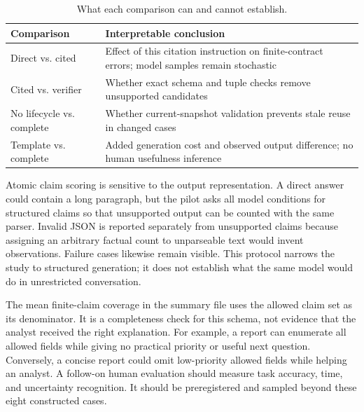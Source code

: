 \begin{table}[t]
\centering\caption{What each comparison can and cannot establish.}
\label{tab:comparators}
\begin{tabular}{p{}p{}}
\hline
Comparison & Interpretable conclusion\\\hline
Direct vs. cited & Effect of this citation instruction on finite-contract errors; model samples remain stochastic\\
Cited vs. verifier & Whether exact schema and tuple checks remove unsupported candidates\\
No lifecycle vs. complete & Whether current-snapshot validation prevents stale reuse in changed cases\\
Template vs. complete & Added generation cost and observed output difference; no human usefulness inference\\\hline
\end{tabular}
\end{table}

Atomic claim scoring is sensitive to the output representation. A direct answer could contain a long paragraph, but the pilot asks all model conditions for structured claims so that unsupported output can be counted with the same parser. Invalid JSON is reported separately from unsupported claims because assigning an arbitrary factual count to unparseable text would invent observations. Failure cases likewise remain visible. This protocol narrows the study to structured generation; it does not establish what the same model would do in unrestricted conversation.

The mean finite-claim coverage in the summary file uses the allowed claim set as its denominator. It is a completeness check for this schema, not evidence that the analyst received the right explanation. For example, a report can enumerate all allowed fields while giving no practical priority or useful next question. Conversely, a concise report could omit low-priority allowed fields while helping an analyst. A follow-on human evaluation should measure task accuracy, time, and uncertainty recognition. It should be preregistered and sampled beyond these eight constructed cases.

